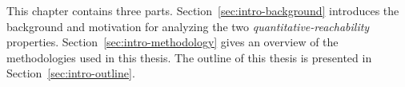 This chapter contains three parts.
Section~\ref{sec:intro-background} introduces the background and motivation for analyzing
the two \emph{quantitative-reachability} properties.
Section~\ref{sec:intro-methodology} gives an overview of the methodologies used in this thesis.
The outline of this thesis is presented in Section~\ref{sec:intro-outline}. 
